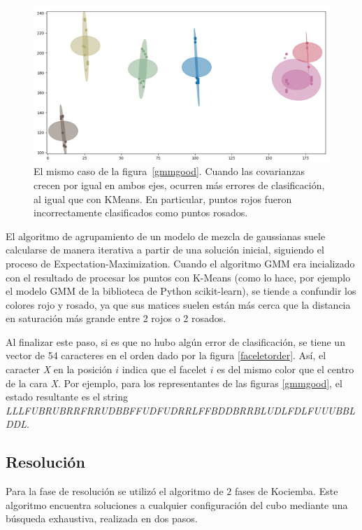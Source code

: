 \begin{figure}[h!]
	\centering
	\includegraphics[width=\textwidth]{figures/gmm_bad}
	\caption[Gaussian Mixture Model con covarianzas circulares.]{El mismo caso de la figura~\ref{gmmgood}. Cuando las covarianzas crecen por igual en ambos ejes, ocurren más errores de clasificación, al igual que con KMeans. En particular, puntos rojos fueron incorrectamente clasificados como puntos rosados.}
	\label{gmmbad}
\end{figure}

El algoritmo de agrupamiento de un modelo de mezcla de gaussianas suele calcularse de manera iterativa a partir de una solución inicial, siguiendo el proceso de Expectation-Maximization. Cuando el algoritmo GMM era incializado con el resultado de procesar los puntos con K-Means (como lo hace, por ejemplo el modelo GMM de la biblioteca de Python scikit-learn), se tiende a confundir los colores rojo y rosado, ya que sus matices suelen están más cerca que la distancia en saturación más grande entre 2 rojos o 2 rosados.

Al finalizar este paso, si es que no hubo algún error de clasificación, se tiene un vector de 54 caracteres en el orden dado por la figura \ref{faceletorder}. Así, el caracter \textit{X} en la posición $i$ indica que el facelet $i$ es del mismo color que el centro de la cara \textit{X}. Por ejemplo, para los representantes de las figuras \ref{gmmgood}, el estado resultante es el string \textit{LLLFUBRUBRRFRRUDBBFFUDFUDRRLFFBDDBRRBLUDLFDLFUUUBBLDDL}.


\subsection{Resolución}
Para la fase de resolución se utilizó el algoritmo de $2$ fases de Kociemba.
Este algoritmo encuentra soluciones a cualquier configuración del cubo mediante una búsqueda exhaustiva, realizada en dos pasos.

